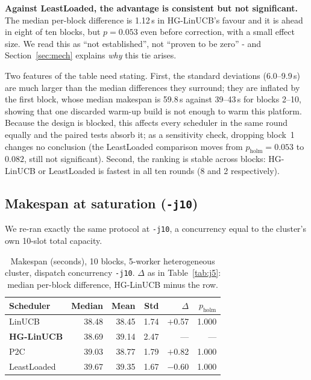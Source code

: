 \documentclass[final,5p,times,twocolumn]{elsarticle}
\begin{document}
\textbf{Against LeastLoaded, the advantage is consistent but not significant.} The median per-block difference is 1.12\,s in HG-LinUCB's favour and it is ahead in eight of ten blocks, but $p=0.053$ even before correction, with a small effect size. We read this as ``not established'', not ``proven to be zero'' - and Section~\ref{sec:mech} explains \emph{why} this tie arises.

Two features of the table need stating. First, the standard deviations (6.0--9.9\,s) are much larger than the median differences they surround; they are inflated by the first block, whose median makespan is 59.8\,s against 39--43\,s for blocks 2--10, showing that one discarded warm-up build is not enough to warm this platform. Because the design is blocked, this affects every scheduler in the same round equally and the paired tests absorb it; as a sensitivity check, dropping block~1 changes no conclusion (the LeastLoaded comparison moves from $p_{\text{holm}}=0.053$ to $0.082$, still not significant). Second, the ranking is stable across blocks: HG-LinUCB or LeastLoaded is fastest in all ten rounds (8 and 2 respectively).

\subsection{Makespan at saturation (\texttt{-j10})}
\label{sec:j10}

We re-ran exactly the same protocol at \texttt{-j10}, a concurrency equal to the cluster's own 10-slot total capacity.

\begin{table}[t]
\centering
\caption{Makespan (seconds), 10 blocks, 5-worker heterogeneous cluster, dispatch concurrency \texttt{-j10}. $\Delta$ as in Table~\ref{tab:j5}: median per-block difference, HG-LinUCB minus the row.}
\label{tab:j10}
\small
\begin{tabular}{lrrrrr}
\toprule
Scheduler & Median & Mean & Std & $\Delta$ & $p_{\text{holm}}$ \\
\midrule
LinUCB & 38.48 & 38.45 & 1.74 & $+$0.57 & 1.000 \\
\textbf{HG-LinUCB} & 38.69 & 39.14 & 2.47 & --- & --- \\
P2C & 39.03 & 38.77 & 1.79 & $+$0.82 & 1.000 \\
LeastLoaded & 39.67 & 39.35 & 1.67 & $-$0.60 & 1.000 \\
\bottomrule
\end{tabular}
\end{table}
\end{document}
